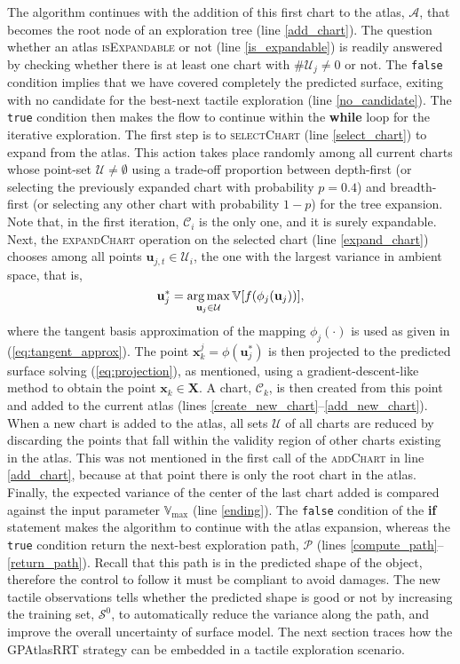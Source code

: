 The algorithm continues with the addition of this first chart to the atlas, $\mathcal{A}$, that becomes the root node of an exploration tree (line \ref{add_chart}). The question whether an atlas \textsc{isExpandable} or not (line \ref{is_expandable}) is readily answered by checking whether there is at least one chart with $\#\mathcal{U}_j \neq 0$ or not. The \texttt{false} condition implies that we have covered completely the predicted surface, exiting with no candidate for the best-next tactile exploration (line \ref{no_candidate}). The \texttt{true} condition then makes the flow to continue within the \textbf{while} loop for the iterative exploration. The first step is to \textsc{selectChart} (line \ref{select_chart}) to expand from the atlas. This action takes place randomly among all current charts whose point-set $\mathcal{U} \neq \emptyset$ using a trade-off proportion between depth-first (or selecting the previously expanded chart with probability $p = 0.4$) and breadth-first (or selecting any other chart with probability $1-p$) for the tree expansion. Note that, in the first iteration, $\mathcal{C}_i$ is the only one, and it is surely expandable. Next, the \textsc{expandChart} operation on the selected chart (line \ref{expand_chart}) chooses among all points $\mathbf{u}_{j,t} \in \mathcal{U}_i$, the one with the largest variance in ambient space, that is,
\begin{equation}
\mathbf{u}_{j}^* =  \operatorname*{arg\,max}_{\mathbf{u}_{j} \in \mathcal{U}} \mathbb{V}[f(\phi_j(\mathbf{u}_{j}))], 
\end{equation}
where the tangent basis approximation of the mapping $\phi_j(\cdot)$ is used as given in (\ref{eq:tangent_approx}). The point $\mathbf{x}_k^j = \phi(\mathbf{u}_{j}^*)$ is then projected to the predicted surface solving (\ref{eq:projection}), as mentioned, using a gradient-descent-like method to obtain the point $\mathbf{x}_k \in \mathbf{X}$. A chart, $\mathcal{C}_k$, is then created from this point and added to the current atlas (lines \ref{create_new_chart}--\ref{add_new_chart}). When a new chart is added to the atlas, all sets $\mathcal{U}$ of all charts are reduced by discarding the points that fall within the validity region of other charts existing in the atlas. This was not mentioned in the first call of the \textsc{addChart} in line \ref{add_chart}, because at that point there is only the root chart in the atlas. Finally, the expected variance of the center of the last chart added is compared against the input parameter $\mathbb{V}_{\max}$ (line \ref{ending}). The \texttt{false} condition of the \textbf{if} statement makes the algorithm to continue with the atlas expansion, whereas the \texttt{true} condition return the next-best exploration path, $\mathcal{P}$ (lines \ref{compute_path}--\ref{return_path}). Recall that this path is in the predicted shape of the object, therefore the control to follow it must be compliant to avoid damages. The new tactile observations tells whether the predicted shape is good or not by increasing the training set, $\mathcal{S}^0$, to automatically reduce the variance along the path, and improve the overall uncertainty of surface model. The next section traces how the GPAtlasRRT strategy can be embedded in a tactile exploration scenario.

